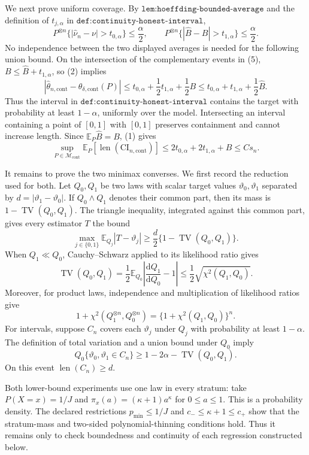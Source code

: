 We next prove uniform coverage.  By \(\texttt{lem:hoeffding-bounded-average}\) and the definition of \(t_{j,\alpha}\) in \(\texttt{def:continuity-honest-interval}\),
\[
 P^{\otimes n}\{|\widehat\nu_n-\nu|>t_{0,\alpha}\}\leq\frac\alpha2,
 \qquad
 P^{\otimes n}\{|\widehat B-B|>t_{1,\alpha}\}\leq\frac\alpha2. \tag{5}
\]
No independence between the two displayed averages is needed for the following union bound.  On the intersection of the complementary events in (5), \(B\leq\widehat B+t_{1,\alpha}\), so (2) implies
\[
 |\widehat\theta_{n,\mathrm{cont}}-\theta_{\delta,\mathrm{cont}}(P)|
 \leq t_{0,\alpha}+\frac12t_{1,\alpha}+\frac12B
 \leq t_{0,\alpha}+t_{1,\alpha}+\frac12\widehat B. \tag{6}
\]
Thus the interval in \(\texttt{def:continuity-honest-interval}\) contains the target with probability at least \(1-\alpha\), uniformly over the model.  Intersecting an interval containing a point of \([0,1]\) with \([0,1]\) preserves containment and cannot increase length.  Since \(\mathbb E_P\widehat B=B\), (1) gives
\[
 \sup_{P\in\mathcal M_{\mathrm{cont}}}
 \mathbb E_P[\operatorname{len}(\mathrm{CI}_{n,\mathrm{cont}})]
 \leq2t_{0,\alpha}+2t_{1,\alpha}+B
 \leq Cs_n. \tag{7}
\]

It remains to prove the two minimax converses.  We first record the reduction used for both.  Let \(Q_0,Q_1\) be two laws with scalar target values \(\vartheta_0,\vartheta_1\) separated by \(d=|\vartheta_1-\vartheta_0|\).  If \(Q_0\wedge Q_1\) denotes their common part, then its mass is \(1-\operatorname{TV}(Q_0,Q_1)\).  The triangle inequality, integrated against this common part, gives every estimator \(T\) the bound
\[
 \max_{j\in\{0,1\}}\mathbb E_{Q_j}|T-\vartheta_j|
 \geq\frac d2\{1-\operatorname{TV}(Q_0,Q_1)\}. \tag{8}
\]
When \(Q_1\ll Q_0\), Cauchy--Schwarz applied to its likelihood ratio gives
\[
 \operatorname{TV}(Q_0,Q_1)
 =\frac12\mathbb E_{Q_0}\left|\frac{\mathrm dQ_1}{\mathrm dQ_0}-1\right|
 \leq\frac12\sqrt{\chi^2(Q_1,Q_0)}. \tag{9}
\]
Moreover, for product laws, independence and multiplication of likelihood ratios give
\[
 1+\chi^2(Q_1^{\otimes n},Q_0^{\otimes n})
 =\{1+\chi^2(Q_1,Q_0)\}^n. \tag{10}
\]
For intervals, suppose \(C_n\) covers each \(\vartheta_j\) under \(Q_j\) with probability at least \(1-\alpha\).  The definition of total variation and a union bound under \(Q_0\) imply
\[
 Q_0\{\vartheta_0,\vartheta_1\in C_n\}
 \geq1-2\alpha-\operatorname{TV}(Q_0,Q_1). \tag{11}
\]
On this event \(\operatorname{len}(C_n)\geq d\).

Both lower-bound experiments use one law in every stratum: take \(P(X=x)=1/J\) and
\(\pi_x(a)=(\kappa+1)a^\kappa\) for \(0\leq a\leq1\).  This is a probability density.  The declared restrictions \(p_{\min}\leq1/J\) and \(c_-\leq\kappa+1\leq c_+\) show that the stratum-mass and two-sided polynomial-thinning conditions hold.  Thus it remains only to check boundedness and continuity of each regression constructed below.

